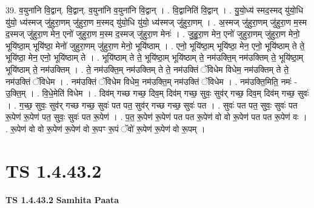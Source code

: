 \documentclass[17pt]{extarticle}
\begin{document}
39. व॒युना॑नि वि॒द्वान्. वि॒द्वान्. व॒युना॑नि व॒युना॑नि वि॒द्वान् । . वि॒द्वानिति॑ वि॒द्वान् । . यु॒यो॒ध्य॑ स्मद॒स्मद् यु॑यो॒धि यु॑यो॒ ध्य॑स्मज् जु॑हुरा॒णम् जु॑हुरा॒ण म॒स्मद् यु॑यो॒धि यु॑यो॒ ध्य॑स्मज् जु॑हुरा॒णम् । . अ॒स्मज् जु॑हुरा॒णम् जु॑हुरा॒ण म॒स्म द॒स्मज् जु॑हुरा॒ण मेन॒ एनो॑ जुहुरा॒ण म॒स्म द॒स्मज् जु॑हुरा॒ण मेनः॑ । . जु॒हु॒रा॒ण मेन॒ एनो॑ जुहुरा॒णम् जु॑हुरा॒ण मेनो॒ भूयि॑ष्ठा॒म् भूयि॑ष्ठा॒ मेनो॑ जुहुरा॒णम् जु॑हुरा॒ण मेनो॒ भूयि॑ष्ठाम् । . एनो॒ भूयि॑ष्ठा॒म् भूयि॑ष्ठा॒ मेन॒ एनो॒ भूयि॑ष्ठाम् ते ते॒ भूयि॑ष्ठा॒ मेन॒ एनो॒ भूयि॑ष्ठाम् ते । . भूयि॑ष्ठाम् ते ते॒ भूयि॑ष्ठा॒म् भूयि॑ष्ठाम् ते॒ नम॑उक्ति॒म् नम॑उक्तिम् ते॒ भूयि॑ष्ठा॒म् भूयि॑ष्ठाम् ते॒ नम॑उक्तिम् । . ते॒ नम॑उक्ति॒म् नम॑उक्तिम् ते ते॒ नम॑उक्तिं ॅविधेम विधेम॒ नम॑उक्तिम् ते ते॒ नम॑उक्तिं ॅविधेम । . नम॑उक्तिं ॅविधेम विधेम॒ नम॑उक्ति॒म् नम॑उक्तिं ॅविधेम । . नम॑उक्ति॒मिति॒ नमः॑ - उ॒क्ति॒म् । . वि॒धे॒मेति॑ विधेम । . दिव॑म् गच्छ गच्छ॒ दिव॒म् दिव॑म् गच्छ॒ सुवः॒ सुव॑र् गच्छ॒ दिव॒म् दिव॑म् गच्छ॒ सुवः॑ । . ग॒च्छ॒ सुवः॒ सुव॑र् गच्छ गच्छ॒ सुवः॑ पत पत॒ सुव॑र् गच्छ गच्छ॒ सुवः॑ पत । . सुवः॑ पत पत॒ सुवः॒ सुवः॑ पत रू॒पेण॑ रू॒पेण॑ पत॒ सुवः॒ सुवः॑ पत रू॒पेण॑ । . प॒त॒ रू॒पेण॑ रू॒पेण॑ पत पत रू॒पेण॑ वो वो रू॒पेण॑ पत पत रू॒पेण॑ वः । . रू॒पेण॑ वो वो रू॒पेण॑ रू॒पेण॑ वो रू॒पꣳ रू॒पं ॅवो॑ रू॒पेण॑ रू॒पेण॑ वो रू॒पम् । \newline
\pagebreak
{}
\section*{ TS 1.4.43.2 }

\textbf{TS 1.4.43.2 } \newline
\textbf{Samhita Paata} \newline
\end{document}
